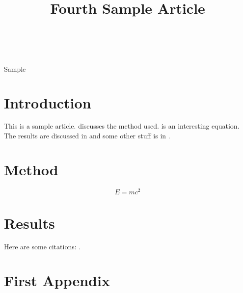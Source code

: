 \documentclass[wcp]{jmlr}
\title[Article 4]{Fourth Sample Article}
\author{\Name{Mary-Jane {de Beer}}\Email{mjdb@sample.com}\\
\addr{University of No Where}}
\begin{document}
\maketitle

\begin{abstract}
\lipsum[1]
\end{abstract}
\begin{keywords}
Sample
\end{keywords}

\section{Introduction}

This is a sample article.  discusses
the method used.  is an interesting 
equation. The results are discussed in 
and some other stuff is in .

\lipsum

\section{Method}\label{sec:method}

\lipsum

\begin{equation}\label{eq:emc2}
E = mc^2
\end{equation}

\section{Results}\label{sec:results}

\lipsum

Here are some citations: \citet{guyon-elisseeff-03,guyon2007causalreport}.



\appendix
\section{First Appendix}\label{apd:first}

\lipsum
\end{document}
